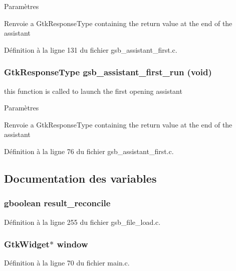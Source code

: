 \begin{DoxyParams}{Paramètres}
\item[{\em }]\end{DoxyParams}
\begin{DoxyReturn}{Renvoie}
a GtkResponseType containing the return value at the end of the assistant 
\end{DoxyReturn}


Définition à la ligne 131 du fichier gsb\_\-assistant\_\-first.c.

\subsubsection[{gsb\_\-assistant\_\-first\_\-run}]{\setlength{\rightskip}{0pt plus 5cm}GtkResponseType gsb\_\-assistant\_\-first\_\-run (void)}\label{gsb__assistant__first_8c_a690d09449b23b2197933c554f5089a1b}
this function is called to launch the first opening assistant


\begin{DoxyParams}{Paramètres}
\item[{\em }]\end{DoxyParams}
\begin{DoxyReturn}{Renvoie}
a GtkResponseType containing the return value at the end of the assistant 
\end{DoxyReturn}


Définition à la ligne 76 du fichier gsb\_\-assistant\_\-first.c.



\subsection{Documentation des variables}
\subsubsection[{result\_\-reconcile}]{\setlength{\rightskip}{0pt plus 5cm}gboolean {\bf result\_\-reconcile}}\label{gsb__assistant__first_8c_ac165dc8e950fecfeea085204f948425e}


Définition à la ligne 255 du fichier gsb\_\-file\_\-load.c.

\subsubsection[{window}]{\setlength{\rightskip}{0pt plus 5cm}GtkWidget$\ast$ {\bf window}}\label{gsb__assistant__first_8c_a3d346c08cf2d67c388caabffb412b293}


Définition à la ligne 70 du fichier main.c.

